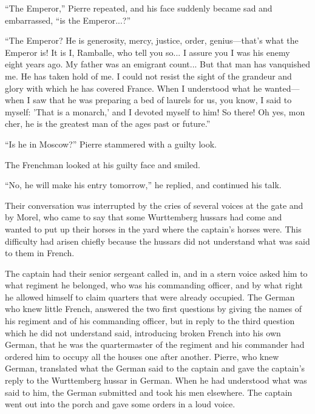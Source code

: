 ``The Emperor,'' Pierre repeated, and his face suddenly became
sad and embarrassed, ``is the Emperor...?''

``The Emperor? He is generosity, mercy, justice, order,
genius---that's what the Emperor is! It is I, Ramballe, who tell
you so... I assure you I was his enemy eight years ago. My father
was an emigrant count... But that man has vanquished me. He has
taken hold of me. I could not resist the sight of the grandeur
and glory with which he has covered France.  When I understood
what he wanted---when I saw that he was preparing a bed of
laurels for us, you know, I said to myself: 'That is a monarch,'
and I devoted myself to him! So there! Oh yes, mon cher, he is
the greatest man of the ages past or future.''

``Is he in Moscow?'' Pierre stammered with a guilty look.

The Frenchman looked at his guilty face and smiled.

``No, he will make his entry tomorrow,'' he replied, and
continued his talk.

Their conversation was interrupted by the cries of several voices
at the gate and by Morel, who came to say that some Wurttemberg
hussars had come and wanted to put up their horses in the yard
where the captain's horses were. This difficulty had arisen
chiefly because the hussars did not understand what was said to
them in French.

The captain had their senior sergeant called in, and in a stern
voice asked him to what regiment he belonged, who was his
commanding officer, and by what right he allowed himself to claim
quarters that were already occupied. The German who knew little
French, answered the two first questions by giving the names of
his regiment and of his commanding officer, but in reply to the
third question which he did not understand said, introducing
broken French into his own German, that he was the quartermaster
of the regiment and his commander had ordered him to occupy all
the houses one after another. Pierre, who knew German, translated
what the German said to the captain and gave the captain's reply
to the Wurttemberg hussar in German. When he had understood what
was said to him, the German submitted and took his men
elsewhere. The captain went out into the porch and gave some
orders in a loud voice.

